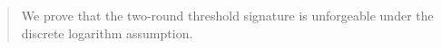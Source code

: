 \begin{abstract}
We prove that the two-round threshold signature is unforgeable under the discrete logarithm assumption.
\end{abstract}
